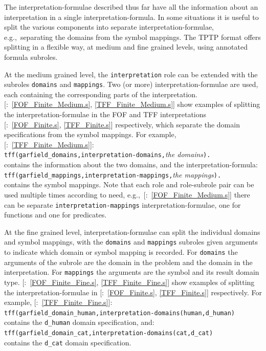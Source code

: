\documentclass{ceurart}
\newcommand{\smalltt}[1]{\small \texttt{#1}}
\newcommand{\example}{{\scriptsize \faFile[regular]}}
\begin{document}
The interpretation-formulae described thus far have all the information about an interpretation 
in a single interpretation-formula.
In some situations it is useful to split the various components into separate 
interpretation-formulae, e.g.,~separating the domains from the symbol mappings.
The TPTP format offers splitting in a flexible way, at medium and fine grained levels, using 
annotated formula subroles.

At the medium grained level, the \smalltt{interpretation} role can be extended with the subroles
\smalltt{domains} and \smalltt{mappings}.
Two (or more) interpretation-formulae are used, each containing the corresponding parts of the 
interpretation.
[\example{}:~\ref{FOF_Finite_Medium.s}, \ref{TFF_Finite_Medium.s}]
show examples of splitting the interpretation-formulae in the FOF and TFF 
interpretations [\example{}:~\ref{FOF_Finite.s}, \ref{TFF_Finite.s}] 
respectively, which separate the domain specifications from the symbol mappings.
For example, [\example{}:~\ref{TFF_Finite_Medium.s}]:\\
\hspace*{0.5cm}\smalltt{tff(garfield\_domains,interpretation-domains,}\emph{the domains}\smalltt{).} \\
contains the information about the two domains, and the interpretation-formula: \\
\hspace*{0.5cm}\smalltt{tff(garfield\_mappings,interpretation-mappings,}\emph{the mappings}\smalltt{).} \\
contains the symbol mappings.
Note that each role and role-subrole pair can be used multiple times according to need, 
e.g.,~[\example{}:~\ref{FOF_Finite_Medium.s}] there can be separate
\smalltt{interpretation-mappings} interpretation-formulae, one for functions and one for 
predicates.

At the fine grained level, interpretation-formulae can split the individual domains and symbol 
mappings, with the \smalltt{domains} and \smalltt{mappings} subroles given arguments to indicate
which domain or symbol mapping is recorded.
For \smalltt{domains} the arguments of the subrole are the domain in the problem and the domain 
in the interpretation.
For \smalltt{mappings} the arguments are the symbol and its result domain type.
[\example{}:~\ref{FOF_Finite_Fine.s}, \ref{TFF_Finite_Fine.s}] show 
examples of splitting the interpretation-formulae in
[\example{}:~\ref{FOF_Finite.s}, \ref{TFF_Finite.s}] respectively.
For example, [\example{}:~\ref{TFF_Finite_Fine.s}]:\\
\hspace*{0.5cm}\smalltt{tff(garfield\_domain\_human,interpretation-domains(human,d\_human)} \\
contains the \smalltt{d\_human} domain specification, and: \\
\hspace*{0.5cm}\smalltt{tff(garfield\_domain\_cat,interpretation-domains(cat,d\_cat)} \\
contains the \smalltt{d\_cat} domain specification.
\end{document}
